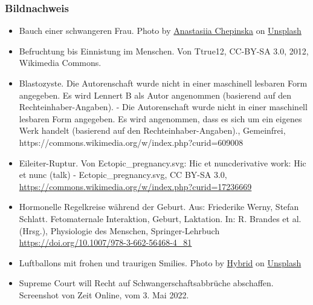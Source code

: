 \documentclass{beamer}
\begin{document}
\begin{frame}
\frametitle{Bildnachweis}

\begin{tiny}
 
\begin{itemize}


\item
Bauch einer schwangeren Frau. Photo by \href{https://unsplash.com/es/@anastasiiachepinska?utm_source=unsplash&utm_medium=referral&utm_content=creditCopyText}{Anastasiia Chepinska} on \href{https://unsplash.com/s/photos/pregnancy?utm_source=unsplash&utm_medium=referral&utm_content=creditCopyText}{Unsplash}


\item
Befruchtung bis Einnistung im Menschen. Von Ttrue12, CC-BY-SA 3.0, 2012, Wikimedia Commons. 

\item
Blastozyste. Die Autorenschaft wurde nicht in einer maschinell lesbaren Form angegeben. Es wird Lennert B als Autor angenommen (basierend auf den Rechteinhaber-Angaben). - Die Autorenschaft wurde nicht in einer maschinell lesbaren Form angegeben. Es wird angenommen, dass es sich um ein eigenes Werk handelt (basierend auf den Rechteinhaber-Angaben)., Gemeinfrei, https://commons.wikimedia.org/w/index.php?curid=609008

\item
Eileiter-Ruptur. Von Ectopic\_pregnancy.svg: Hic et nuncderivative work: Hic et nunc (talk) - Ectopic\_pregnancy.svg, CC BY-SA 3.0, \url{https://commons.wikimedia.org/w/index.php?curid=17236669}

\item
Hormonelle Regelkreise während der Geburt. Aus: Friederike Werny, Stefan Schlatt. Fetomaternale Interaktion, Geburt, Laktation. In: R. Brandes et al. (Hrsg.), Physiologie des Menschen, Springer-Lehrbuch \url{https://doi.org/10.1007/978-3-662-56468-4_81}


\item
Luftballons mit frohen und traurigen Smilies. Photo by \href{https://unsplash.com/@artbyhybrid?utm_source=unsplash&utm_medium=referral&utm_content=creditCopyText}{Hybrid} on \href{https://unsplash.com/s/photos/feedback?utm_source=unsplash&utm_medium=referral&utm_content=creditCopyText}{Unsplash}

\item
Supreme Court will Recht auf Schwangerschaftsabbrüche abschaffen. Screenshot von Zeit Online, vom 3. Mai 2022.
\end{itemize}
\end{tiny}
\end{frame}
\end{document}
